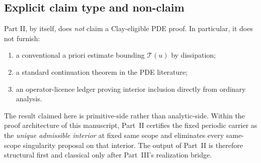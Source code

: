 \subsection{Explicit claim type and non-claim}
\begin{proposition}\label{prop:explicit-non-claim}
Part II, by itself, does \emph{not} claim a Clay-eligible PDE proof. In particular, it does not furnish:
\begin{enumerate}[label=(\alph*), leftmargin=2.2em]
\item a conventional a priori estimate bounding $\mathcal T(u)$ by dissipation;
\item a standard continuation theorem in the PDE literature;
\item an operator-licence ledger proving interior inclusion directly from ordinary analysis.
\end{enumerate}
The result claimed here is primitive-side rather than analytic-side. Within the proof architecture of this manuscript, Part~II certifies the fixed periodic carrier as the \emph{unique admissible interior} at fixed same scope and eliminates every same-scope singularity proposal on that interior. The output of Part~II is therefore structural first and classical only after Part~III's realization bridge.
\end{proposition}

